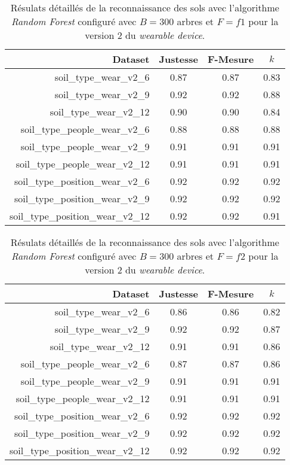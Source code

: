 \begin{table}[H]\renewcommand{\arraystretch}{0.5}
	\centering
	\caption{Résulats détaillés de la reconnaissance des sols avec l'algorithme \textit{Random Forest} configuré avec $B=300$ arbres et $F=f1$ pour la version 2 du \textit{wearable device}.}
	\label{tab:tab:rf-300-f1-wear-v2}
	\begin{tabular}{@{}rccc@{}}
		\toprule
			\textbf{Dataset} & \textbf{Justesse} & \textbf{F-Mesure} & \textbf{$k$} \\
		\midrule
			soil\_type\_wear\_v2\_6 & 0.87 & 0.87 & 0.83 \\
			soil\_type\_wear\_v2\_9 & 0.92 & 0.92 & 0.88 \\
			soil\_type\_wear\_v2\_12 & 0.90 & 0.90 & 0.84 \\
			soil\_type\_people\_wear\_v2\_6 & 0.88 & 0.88 & 0.88 \\
			soil\_type\_people\_wear\_v2\_9 & 0.91 & 0.91 & 0.91 \\
			soil\_type\_people\_wear\_v2\_12 & 0.91 & 0.91 & 0.91 \\
			soil\_type\_position\_wear\_v2\_6 & 0.92 & 0.92 & 0.92 \\
			soil\_type\_position\_wear\_v2\_9 & 0.92 & 0.92 & 0.92 \\
			soil\_type\_position\_wear\_v2\_12 & 0.92 & 0.92 & 0.91 \\
		\bottomrule
	\end{tabular}
\end{table}

\begin{table}[H]\renewcommand{\arraystretch}{0.5}
	\centering
	\caption{Résulats détaillés de la reconnaissance des sols avec l'algorithme \textit{Random Forest} configuré avec $B=300$ arbres et $F=f2$ pour la version 2 du \textit{wearable device}.}
	\label{tab:tab:rf-300-f2-wear-v2}
	\begin{tabular}{@{}rccc@{}}
		\toprule
			\textbf{Dataset} & \textbf{Justesse} & \textbf{F-Mesure} & \textbf{$k$} \\
		\midrule
			soil\_type\_wear\_v2\_6 & 0.86 & 0.86 & 0.82 \\
			soil\_type\_wear\_v2\_9 & 0.92 & 0.92 & 0.87 \\
			soil\_type\_wear\_v2\_12 & 0.91 & 0.91 & 0.86 \\
			soil\_type\_people\_wear\_v2\_6 & 0.87 & 0.87 & 0.86 \\
			soil\_type\_people\_wear\_v2\_9 & 0.91 & 0.91 & 0.91 \\
			soil\_type\_people\_wear\_v2\_12 & 0.91 & 0.91 & 0.91 \\
			soil\_type\_position\_wear\_v2\_6 & 0.92 & 0.92 & 0.92 \\
			soil\_type\_position\_wear\_v2\_9 & 0.92 & 0.92 & 0.92 \\
			soil\_type\_position\_wear\_v2\_12 & 0.92 & 0.92 & 0.92 \\
		\bottomrule
	\end{tabular}
\end{table}

